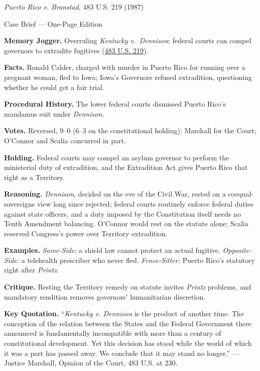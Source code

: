 \documentclass[12pt]{article}
\begin{document}
\begin{center}
{\Large \textit{Puerto Rico v. Branstad}, 483 U.S. 219 (1987)\par}
\vspace{0.3em}
{\normalsize Case Brief --- One-Page Edition\par}
\end{center}

\textbf{Memory Jogger.} Overruling \textit{Kentucky v.\ Dennison}: federal courts can compel governors to extradite fugitives (\href{https://supreme.justia.com/cases/federal/us/483/219/}{483 U.S. 219}).

\textbf{Facts.} Ronald Calder, charged with murder in Puerto Rico for running over a pregnant woman, fled to Iowa; Iowa's Governors refused extradition, questioning whether he could get a fair trial.

\textbf{Procedural History.} The lower federal courts dismissed Puerto Rico's mandamus suit under \textit{Dennison}.

\textbf{Votes.} Reversed, 9--0 (6--3 on the constitutional holding): Marshall for the Court; O'Connor and Scalia concurred in part.

\textbf{Holding.} Federal courts may compel an asylum governor to perform the ministerial duty of extradition, and the Extradition Act gives Puerto Rico that right as a Territory.

\textbf{Reasoning.} \textit{Dennison}, decided on the eve of the Civil War, rested on a coequal-sovereigns view long since rejected; federal courts routinely enforce federal duties against state officers, and a duty imposed by the Constitution itself needs no Tenth Amendment balancing. O'Connor would rest on the statute alone; Scalia reserved Congress's power over Territory extradition.

\textbf{Examples.} \emph{Same-Side:} a shield law cannot protect an actual fugitive. \emph{Opposite-Side:} a telehealth prescriber who never fled. \emph{Fence-Sitter:} Puerto Rico's statutory right after \textit{Printz}.

\textbf{Critique.} Resting the Territory remedy on statute invites \textit{Printz} problems, and mandatory rendition removes governors' humanitarian discretion.

\textbf{Key Quotation.} ``\emph{Kentucky v. Dennison} is the product of another time. The conception of the relation between the States and the Federal Government there announced is fundamentally incompatible with more than a century of constitutional development. Yet this decision has stood while the world of which it was a part has passed away. We conclude that it may stand no longer.'' --- Justice Marshall, Opinion of the Court, 483 U.S. at 230.
\end{document}
